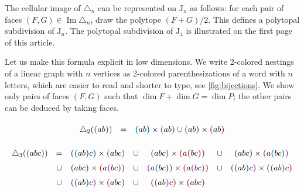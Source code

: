 \documentclass[twoside, 12pt]{amsart}
\theoremstyle{remark}
\newcommand{\J}{\mathrm{J}}
\newcommand{\blue}[1]{\textcolor{MidnightBlue}{\textbf{(}} #1 \textcolor{MidnightBlue}{\textbf{)}}}
\newcommand{\red}[1]{\textcolor{BrickRed}{\textbf{(}} #1 \textcolor{BrickRed}{\textbf{)}}}
\newcommand{\purple}[1]{\textcolor{Purple}{\textbf{(}} #1 \textcolor{Purple}{\textbf{)}}}
\DeclareMathOperator{\Ima}{Im} %
\begin{document}
The cellular image of $\triangle_n$ can be represented on $\J_n$ as follows: for each pair of faces $(F,G) \in \Ima \triangle_n$, draw the polytope $(F+G)/2$. 
This defines a polytopal subdivision of $\J_n$.
The polytopal subdivision of $\J_4$ is illustrated on the first page of this article.

\medskip

Let us make this formula explicit in low dimensions. 
We write 2-colored nestings of a linear graph with $n$ vertices as 2-colored parenthesizations of a word with $n$ letters, which are easier to read and shorter to type, see \cref{fig:bijections}. 
We show only pairs of faces $(F,G)$ such that $\dim F + \dim G = \dim P$; the other pairs can be deduced by taking faces.

\begin{equation*}
  \begin{matrix}
      \triangle_2(\purple{ab}) & = & \blue{ab} \times \purple{ab} \cup \purple{ab} \times \red{ab}
  \end{matrix}
\end{equation*}

\begin{equation*}
  \renewcommand*{\arraystretch}{1.5}
  \begin{matrix}
      \triangle_3(\purple{abc}) 
      & = & \blue{\blue{ab} c} \times \purple{abc} 
      & \cup & \purple{abc} \times \red{a \red{bc}}
      & \cup & \blue{abc} \times \purple{a \blue{bc}} \\
      & \cup & \blue{abc} \times \red{a \purple{bc}}  
      & \cup & \purple{a \blue{bc}} \times \red{a \purple{bc}} 
      & \cup & \purple{\blue{ab} c} \times \red{\purple{ab} c} \\
      & \cup & \purple{\blue{ab} c} \times \red{abc} 
      & \cup & \red{\purple{ab} c} \times \red{abc} 
  \end{matrix}
\end{equation*}
\end{document}
